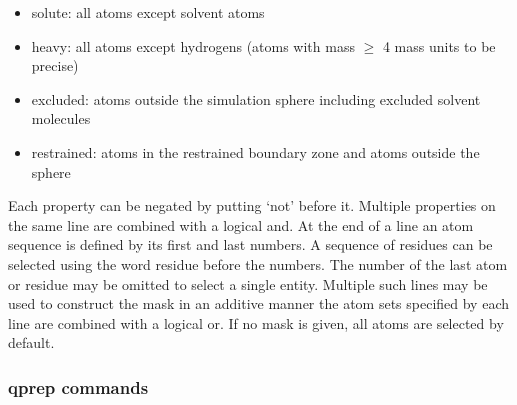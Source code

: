 \documentclass[a4paper,10pt]{article}
\begin{document}
\begin{itemize}
\item solute: all atoms except solvent atoms
\item heavy: all atoms except hydrogens (atoms with mass $\ge$ 4 mass units to be precise)
\item excluded: atoms outside the simulation sphere including excluded solvent molecules
\item restrained: atoms in the restrained boundary zone and atoms outside the sphere
\end{itemize}

Each property can be negated by putting `not' before it. Multiple
properties on the same line are combined with a logical and. At
the end of a line an atom sequence is defined by its first and
last numbers. A sequence of residues can be selected using the
word residue before the numbers. The number of the last atom or
residue may be omitted to select a single entity. Multiple such
lines may be used to construct the mask in an additive manner {\-}
the atom sets specified by each line are combined with a logical
or. If no mask is given, all atoms are selected by default.

\subsubsection{\textbf{qprep} commands}
\end{document}
